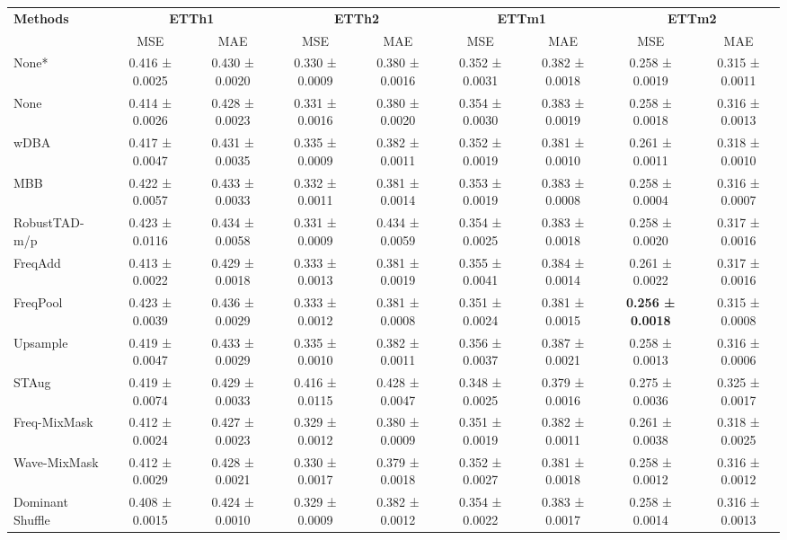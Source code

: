 \begin{table}[h!]
\centering
\vspace{0.2cm}
\renewcommand{\arraystretch}{1.3}
\begin{adjustbox}{max width=\textwidth}
\begin{tabular}{l|cc|cc|cc|cc}
    \toprule
    \textbf{Methods} & \multicolumn{2}{c|}{\textbf{ETTh1}} & \multicolumn{2}{c|}{\textbf{ETTh2}} & \multicolumn{2}{c|}{\textbf{ETTm1}} & \multicolumn{2}{c}{\textbf{ETTm2}} \\
    & MSE & MAE & MSE & MAE & MSE & MAE & MSE & MAE \\
    \midrule
    None* & 0.416 ± 0.0025 & 0.430 ± 0.0020 & 0.330 ± 0.0009 & 0.380 ± 0.0016 & 0.352 ± 0.0031 & 0.382 ± 0.0018 & 0.258 ± 0.0019 & 0.315 ± 0.0011 \\
            None         & 0.414 ± 0.0026 & 0.428 ± 0.0023 & 0.331 ± 0.0016 & 0.380 ± 0.0020 & 0.354 ± 0.0030 & 0.383 ± 0.0019 & 0.258 ± 0.0018 & 0.316 ± 0.0013  \\
        wDBA          & 0.417 ± 0.0047 & 0.431 ± 0.0035 & 0.335 ± 0.0009 & 0.382 ± 0.0011 & 0.352 ± 0.0019 & 0.381 ± 0.0010 & 0.261 ± 0.0011 & 0.318 ± 0.0010  \\
        MBB          & 0.422 ± 0.0057 & 0.433 ± 0.0033 & 0.332 ± 0.0011 & 0.381 ± 0.0014 & 0.353 ± 0.0019 & 0.383 ± 0.0008 & 0.258 ± 0.0004 & 0.316 ± 0.0007  \\
        RobustTAD-m/p  & 0.423 ± 0.0116 & 0.434 ± 0.0058 & 0.331 ± 0.0009 & 0.434 ± 0.0059 & 0.354 ± 0.0025 & 0.383 ± 0.0018 & 0.258 ± 0.0020 & 0.317 ± 0.0016  \\
        FreqAdd      & 0.413 ± 0.0022 & 0.429 ± 0.0018 & 0.333 ± 0.0013 & 0.381 ± 0.0019 & 0.355 ± 0.0041 & 0.384 ± 0.0014 & 0.261 ± 0.0022 & 0.317 ± 0.0016  \\
        FreqPool     & 0.423 ± 0.0039 & 0.436 ± 0.0029 & 0.333 ± 0.0012 & 0.381 ± 0.0008 & 0.351 ± 0.0024 & 0.381 ± 0.0015 & \cellcolor{bestcolor}\textbf{0.256 ± 0.0018} & \cellcolor{secondcolor}0.315 ± 0.0008  \\
        Upsample     & 0.419 ± 0.0047 & 0.433 ± 0.0029 & 0.335 ± 0.0010 & 0.382 ± 0.0011 & 0.356 ± 0.0037 & 0.387 ± 0.0021 & 0.258 ± 0.0013 & 0.316 ± 0.0006  \\
        STAug        & 0.419 ± 0.0074 & 0.429 ± 0.0033 & 0.416 ± 0.0115 & 0.428 ± 0.0047 & \cellcolor{secondcolor}0.348 ± 0.0025 & \cellcolor{secondcolor}0.379 ± 0.0016 & 0.275 ± 0.0036 & 0.325 ± 0.0017  \\
        Freq-MixMask & 0.412 ± 0.0024 & 0.427 ± 0.0023 & 0.329 ± 0.0012 & 0.380 ± 0.0009 & 0.351 ± 0.0019 & 0.382 ± 0.0011 & 0.261 ± 0.0038 & 0.318 ± 0.0025  \\
        Wave-MixMask & 0.412 ± 0.0029 & 0.428 ± 0.0021 & 0.330 ± 0.0017 & \cellcolor{secondcolor}0.379 ± 0.0018 & 0.352 ± 0.0027 & 0.381 ± 0.0018 & 0.258 ± 0.0012 & 0.316 ± 0.0012  \\
        Dominant Shuffle  & \cellcolor{secondcolor}0.408 ± 0.0015 & \cellcolor{secondcolor}0.424 ± 0.0010 & \cellcolor{secondcolor}0.329 ± 0.0009 & 0.382 ± 0.0012 & 0.354 ± 0.0022 & 0.383 ± 0.0017 & 0.258 ± 0.0014 & 0.316 ± 0.0013 \\


\end{tabular}
\end{adjustbox}
\end{table}
